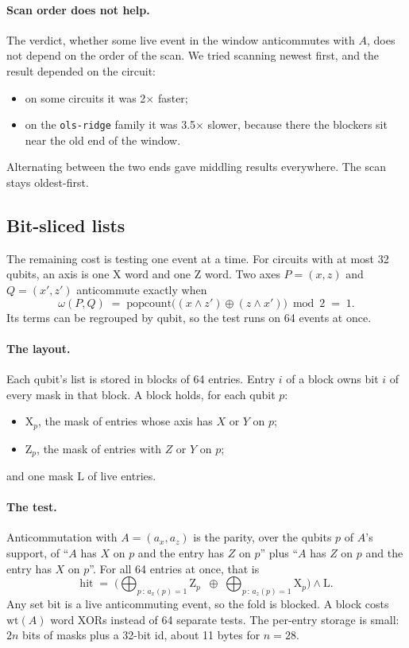 \documentclass[11pt]{article}
\theoremstyle{definition}
\theoremstyle{remark}
\begin{document}
\paragraph{Scan order does not help.}
The verdict, whether some live event in the window anticommutes with $A$, does not depend
on the order of the scan. We tried scanning newest first, and the result depended on the
circuit:
\begin{itemize}[nosep]
  \item on some circuits it was 2$\times$ faster;
  \item on the \texttt{ols-ridge} family it was 3.5$\times$ slower, because there the
  blockers sit near the old end of the window.
\end{itemize}
Alternating between the two ends gave middling results everywhere. The scan stays
oldest-first.

\subsection{Bit-sliced lists}

The remaining cost is testing one event at a time. For circuits with at most 32 qubits, an
axis is one X word and one Z word. Two axes $P = (x, z)$ and $Q = (x', z')$ anticommute
exactly when
\[
  \omega(P, Q) \;=\; \mathrm{popcount}\big((x \wedge z') \oplus (z \wedge x')\big) \bmod 2 \;=\; 1 .
\]
Its terms can be regrouped by qubit, so the test runs on 64 events at once.

\paragraph{The layout.}
Each qubit's list is stored in blocks of 64 entries. Entry $i$ of a block owns bit $i$ of
every mask in that block. A block holds, for each qubit $p$:
\begin{itemize}[nosep]
  \item $\mathrm{X}_p$, the mask of entries whose axis has $X$ or $Y$ on $p$;
  \item $\mathrm{Z}_p$, the mask of entries with $Z$ or $Y$ on $p$;
\end{itemize}
and one mask $\mathrm{L}$ of live entries.

\paragraph{The test.}
Anticommutation with $A = (a_x, a_z)$ is the parity, over the qubits $p$ of $A$'s support,
of ``$A$ has $X$ on $p$ and the entry has $Z$ on $p$'' plus ``$A$ has $Z$ on $p$ and the
entry has $X$ on $p$''. For all 64 entries at once, that is
\[
  \mathrm{hit} \;=\; \Big( \bigoplus_{p \,:\, a_x(p) = 1} \mathrm{Z}_p \;\;\oplus\;
  \bigoplus_{p \,:\, a_z(p) = 1} \mathrm{X}_p \Big) \wedge \mathrm{L} .
\]
Any set bit is a live anticommuting event, so the fold is blocked. A block costs
$\mathrm{wt}(A)$ word XORs instead of 64 separate tests. The per-entry storage is small:
$2n$ bits of masks plus a 32-bit id, about 11 bytes for $n = 28$.
\end{document}

